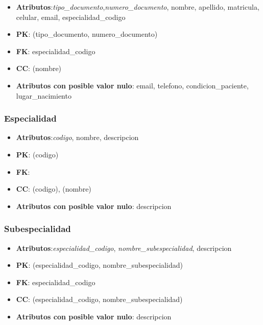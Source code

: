\documentclass[a4paper,11pt]{article}
\begin{document}
\begin{itemize}

\item 
\textbf{Atributos}:\emph{tipo\_documento},\emph{numero\_documento}, nombre, apellido, matricula, celular, email, especialidad\_codigo

\item 
\textbf{PK}: (tipo\_documento, numero\_documento)

\item
\textbf{FK}: especialidad\_codigo

\item 
\textbf{CC}: (nombre)

\item 
\textbf{Atributos con posible valor nulo}: email, telefono, condicion\_paciente, lugar\_nacimiento

\end{itemize}
\subsubsection{\textbf{Especialidad}}

\begin{itemize}

\item 
\textbf{Atributos}:\emph{codigo}, nombre, descripcion

\item 
\textbf{PK}: (codigo)

\item
\textbf{FK}:

\item 
\textbf{CC}: (codigo), (nombre)

\item 
\textbf{Atributos con posible valor nulo}: descripcion

\end{itemize}
\subsubsection{\textbf{Subespecialidad}}

\begin{itemize}

\item 
\textbf{Atributos}:\emph{especialidad\_codigo}, \emph{nombre\_subespecialidad}, descripcion

\item 
\textbf{PK}: (especialidad\_codigo, nombre\_subespecialidad)

\item
\textbf{FK}: especialidad\_codigo

\item 
\textbf{CC}: (especialidad\_codigo, nombre\_subespecialidad)

\item 
\textbf{Atributos con posible valor nulo}: descripcion

\end{itemize}
\end{document}
